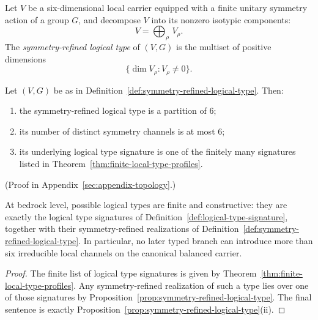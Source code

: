 \begin{definition}
\label{def:symmetry-refined-logical-type}
Let $V$ be a six-dimensional local carrier equipped with a finite unitary
symmetry action of a group $G$, and decompose $V$ into its nonzero isotypic
components:
\[
V=\bigoplus_{\rho}\,V_\rho.
\]
The \emph{symmetry-refined logical type} of $(V,G)$ is the multiset of positive
dimensions
\[
\{\dim V_\rho : V_\rho\neq 0\}.
\]
\end{definition}

\begin{proposition}
\label{prop:symmetry-refined-logical-type}
Let $(V,G)$ be as in Definition~\ref{def:symmetry-refined-logical-type}. Then:
\begin{enumerate}[label=(\roman*), itemsep=0.2em]
\item the symmetry-refined logical type is a partition of $6$;
\item its number of distinct symmetry channels is at most $6$;
\item its underlying logical type signature is one of the finitely many
      signatures listed in Theorem~\ref{thm:finite-local-type-profiles}.
\end{enumerate}
\end{proposition}

(Proof in Appendix~\ref{sec:appendix-topology}.)

\begin{corollary}
\label{cor:logical-types-finite}
At bedrock level, possible logical types are
finite and constructive: they are exactly the logical type signatures of
Definition~\ref{def:logical-type-signature}, together with their
symmetry-refined realizations of
Definition~\ref{def:symmetry-refined-logical-type}. In particular, no later
typed branch can introduce more than six irreducible local channels on the
canonical balanced carrier.
\end{corollary}

\begin{proof}
The finite list of logical type signatures is given by
Theorem~\ref{thm:finite-local-type-profiles}. Any symmetry-refined realization
of such a type lies over one of those signatures by
Proposition~\ref{prop:symmetry-refined-logical-type}. The final sentence is
exactly Proposition~\ref{prop:symmetry-refined-logical-type}(ii).
\end{proof}

